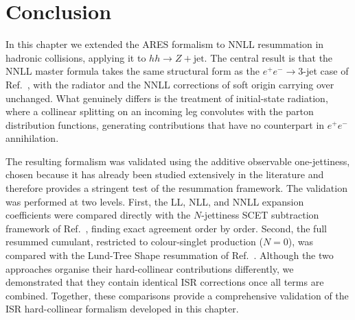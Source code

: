 \section{Conclusion}
\label{sec:conclusion}

In this chapter we extended the \textsc{ARES} formalism to NNLL resummation in
hadronic collisions, applying it to $hh\to Z+\text{jet}$. The central result is
that the NNLL master formula takes the same structural form as the
$e^+e^-\to3$-jet case of Ref.~\cite{Arpino:2019ozn}, with the radiator and the
NNLL corrections of soft origin carrying over unchanged. What genuinely differs
is the treatment of initial-state radiation, where a collinear splitting on an
incoming leg convolutes with the parton distribution functions, generating
contributions that have no counterpart in $e^+e^-$ annihilation.

The resulting formalism was validated using the additive observable
one-jettiness, chosen because it has already been studied extensively in
the literature and therefore provides a stringent test of the
resummation framework. The validation was performed at two levels.
First, the LL, NLL, and NNLL expansion coefficients were compared
directly with the $N$-jettiness SCET subtraction framework of
Ref.~\cite{Gaunt:2015pea}, finding exact agreement order by order.
Second, the full resummed cumulant, restricted to colour-singlet
production ($N=0$), was compared with the Lund-Tree Shape resummation of
Ref.~\cite{vanBeekveld:2025zjh}. Although the two approaches organise
their hard-collinear contributions differently, we demonstrated that
they contain identical ISR corrections once all terms are combined.
Together, these comparisons provide a comprehensive validation of the
ISR hard-collinear formalism developed in this chapter.

